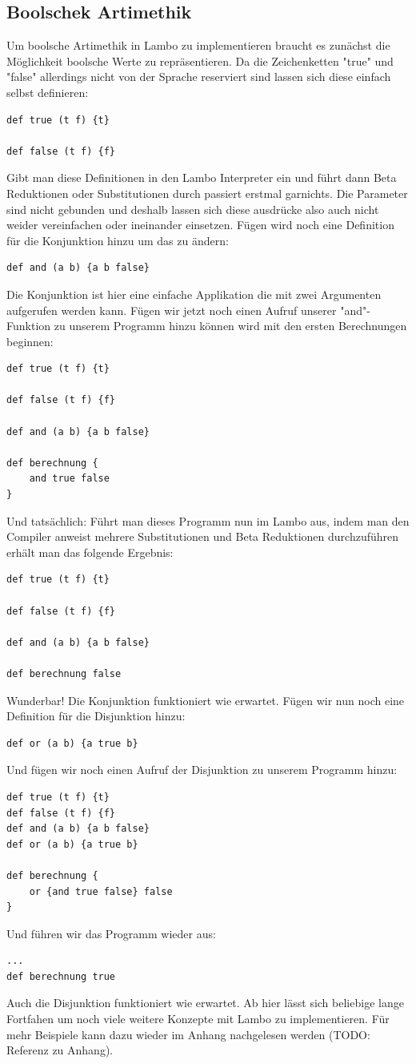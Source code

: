 \documentclass[ngerman]{article}
\begin{document}
\subsection{Boolschek Artimethik}

Um boolsche Artimethik in Lambo zu implementieren braucht es zunächst die Möglichkeit boolsche Werte zu repräsentieren. Da die Zeichenketten "true" und "false" allerdings nicht von der Sprache reserviert sind lassen sich diese einfach selbst definieren:
\begin{lstlisting}
def true (t f) {t}

def false (t f) {f}
\end{lstlisting}
Gibt man diese Definitionen in den Lambo Interpreter ein und führt dann Beta Reduktionen oder Substitutionen durch passiert erstmal garnichts. Die Parameter sind nicht gebunden und deshalb lassen sich diese ausdrücke also auch nicht weider vereinfachen oder ineinander einsetzen. Fügen wird noch eine Definition für die Konjunktion hinzu um das zu ändern:
\begin{lstlisting}
def and (a b) {a b false}
\end{lstlisting}
Die Konjunktion ist hier eine einfache Applikation die mit zwei Argumenten aufgerufen werden kann. Fügen wir jetzt noch einen Aufruf unserer "and"-Funktion zu unserem Programm hinzu können wird mit den ersten Berechnungen beginnen:
\begin{lstlisting}
def true (t f) {t}

def false (t f) {f}

def and (a b) {a b false}

def berechnung {
    and true false
}
\end{lstlisting}
Und tatsächlich: Führt man dieses Programm nun im Lambo aus, indem man den Compiler anweist mehrere Substitutionen und Beta Reduktionen durchzuführen erhält man das folgende Ergebnis:
\begin{lstlisting}
def true (t f) {t}

def false (t f) {f}

def and (a b) {a b false}

def berechnung false
\end{lstlisting}
Wunderbar! Die Konjunktion funktioniert wie erwartet. Fügen wir nun noch eine Definition für die Disjunktion hinzu:
\begin{lstlisting}
def or (a b) {a true b}
\end{lstlisting}
Und fügen wir noch einen Aufruf der Disjunktion zu unserem Programm hinzu:
\begin{lstlisting}
def true (t f) {t}
def false (t f) {f}
def and (a b) {a b false}
def or (a b) {a true b}

def berechnung {
    or {and true false} false
}
\end{lstlisting}
Und führen wir das Programm wieder aus:
\begin{lstlisting}
...
def berechnung true
\end{lstlisting}
Auch die Disjunktion funktioniert wie erwartet. Ab hier lässt sich beliebige lange Fortfahen um noch viele weitere Konzepte mit Lambo zu implementieren. Für mehr Beispiele kann dazu wieder im Anhang nachgelesen werden (TODO: Referenz zu Anhang).
\end{document}

